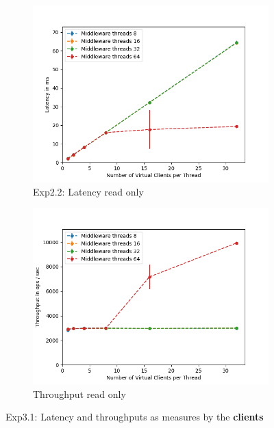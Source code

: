 \documentclass[11pt,a4paper]{article}
\begin{document}
\begin{figure}[H]
\centering
\begin{subfigure}{.5\textwidth}
    \centering
    \includegraphics[width=\textwidth]{img/exp3_1/exp3_1__latency_client_write_0.png}
    \caption{Exp2.2: Latency read only}
    \label{fig:mesh1}
\end{subfigure}%
\begin{subfigure}{.5\textwidth}
      \centering
    \includegraphics[width=\textwidth]{img/exp3_1/exp3_1__throughput_client_write_0.png}
    \caption{Throughput read only}
    \label{fig:mesh1}
\end{subfigure}
\caption{Exp3.1: Latency and throughputs as measures by the \textbf{clients}}
\label{fig:test}
\end{figure}
\end{document}
